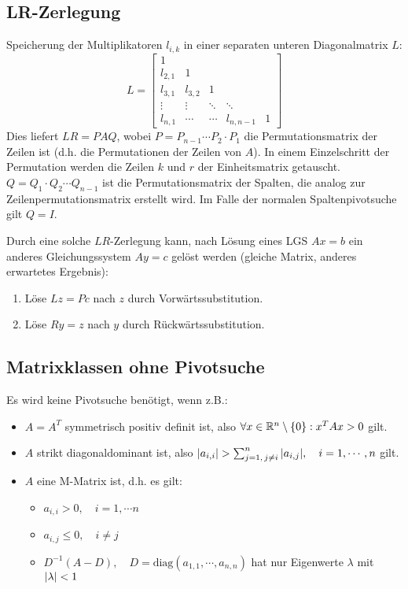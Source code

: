 		\subsection{LR-Zerlegung}
			Speicherung der Multiplikatoren \( l_{i,k} \) in einer separaten unteren Diagonalmatrix \(L\):
			\begin{equation*}
				L =
				\begin{bmatrix}
					1       &         &        &           &   \\
					l_{2,1} & 1       &        &           &   \\
					l_{3,1} & l_{3,2} & 1      &           &   \\
					\vdots  & \vdots  & \ddots & \ddots    &   \\
					l_{n,1} & \cdots  & \cdots & l_{n,n-1} & 1
				\end{bmatrix}
			\end{equation*}
			Dies liefert \( LR = PAQ \), wobei \( P = P_{n-1} \cdots P_2 \cdot P_1 \) die Permutationsmatrix der Zeilen ist (d.h. die Permutationen der Zeilen von \(A\)). In einem Einzelschritt der Permutation werden die Zeilen \(k\) und \(r\) der Einheitsmatrix getauscht. \( Q = Q_1 \cdot Q_2 \cdots Q_{n-1} \) ist die Permutationsmatrix der Spalten, die analog zur Zeilenpermutationsmatrix erstellt wird. Im Falle der normalen Spaltenpivotsuche gilt \( Q = I \).

			Durch eine solche \(LR\)-Zerlegung kann, nach Lösung eines LGS \( Ax = b \) ein anderes Gleichungssystem \( Ay = c \) gelöst werden (gleiche Matrix, anderes erwartetes Ergebnis):
			\begin{enumerate}
				\item Löse \( Lz = Pc \) nach \(z\) durch Vorwärtssubstitution.
				\item Löse \( Ry = z \) nach \(y\) durch Rückwärtssubstitution.
			\end{enumerate}

		\subsection{Matrixklassen ohne Pivotsuche}
			Es wird keine Pivotsuche benötigt, wenn z.B.:
			\begin{itemize}
				\item \( A = A^T \) symmetrisch positiv definit ist, also \( \forall x \in \mathbb{R}^n \setminus \{0\} : x^T A x > 0 \) gilt.
				\item \(A\) strikt diagonaldominant ist, also \( \abs{a_{i,i}} > \sum_{j = 1,\, j \neq i}^{n} \abs{a_{i,j}}, \quad i = 1, \cdots, n \) gilt.
				\item \(A\) eine M-Matrix ist, d.h. es gilt:
					\begin{itemize}
						\item \( a_{i,i} > 0, \quad i = 1, \cdots n \)
						\item \( a_{i,j} \leq 0, \quad i \neq j \)
						\item \( D^{-1} (A - D), \quad D = \textrm{diag}(a_{1,1}, \cdots, a_{n,n}) \) hat nur Eigenwerte \(\lambda\) mit \( \abs{\lambda} < 1 \)
					\end{itemize}
			\end{itemize}

